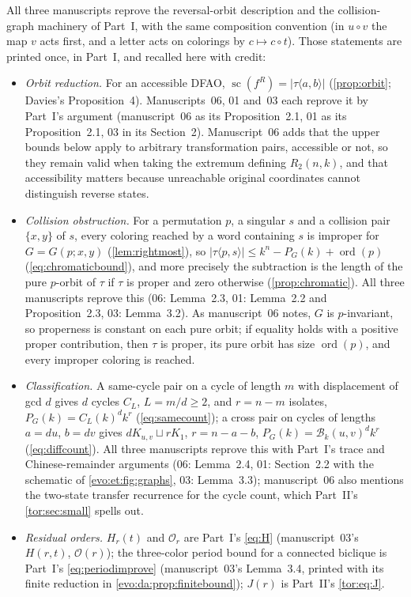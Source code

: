 \documentclass[11pt,a4paper]{article}
\numberwithin{equation}{section}
\theoremstyle{definition}
\theoremstyle{remark}
\newcommand{\ord}{\operatorname{ord}}
\newcommand{\statecomplex}{\operatorname{sc}}
\newcommand{\Bip}{\mathcal B}
\begin{document}
All three manuscripts reprove the reversal-orbit description and the
collision-graph machinery of Part~I, with the same composition convention
(in $u\circ v$ the map $v$ acts first, and a letter acts on colorings by
$c\mapsto c\circ t$). Those statements are printed once, in Part~I, and
recalled here with credit:
\begin{itemize}
\item \emph{Orbit reduction.} For an accessible DFAO,
 $\statecomplex(f^R)=|\tau\langle a,b\rangle|$ (\cref{prop:orbit};
 Davies's Proposition~4). Manuscripts~06, 01 and~03 each reprove it by
 Part~I's argument (manuscript~06 as its Proposition~2.1, 01 as its
 Proposition~2.1, 03 in its Section~2). Manuscript~06 adds that the upper
 bounds below apply to arbitrary transformation pairs, accessible or not, so
 they remain valid when taking the extremum defining $R_2(n,k)$, and that
 accessibility matters because unreachable original coordinates cannot
 distinguish reverse states.
\item \emph{Collision obstruction.} For a permutation $p$, a singular $s$ and
 a collision pair $\{x,y\}$ of $s$, every coloring reached by a word
 containing $s$ is improper for $G=G(p;x,y)$ (\cref{lem:rightmost}), so
 $|\tau\langle p,s\rangle|\le k^n-P_G(k)+\ord(p)$ (\eqref{eq:chromaticbound}),
 and more precisely the subtraction is the length of the pure $p$-orbit of
 $\tau$ if $\tau$ is proper and zero otherwise (\cref{prop:chromatic}). All
 three manuscripts reprove this (06: Lemma~2.3, 01: Lemma~2.2 and
 Proposition~2.3, 03: Lemma~3.2). As manuscript~06 notes, $G$ is
 $p$-invariant, so properness is constant on each pure orbit; if equality
 holds with a positive proper contribution, then $\tau$ is proper, its pure
 orbit has size $\ord(p)$, and every improper coloring is reached.
\item \emph{Classification.} A same-cycle pair on a cycle of length $m$ with
 displacement of gcd $d$ gives $d$ cycles $C_L$, $L=m/d\ge2$, and $r=n-m$
 isolates, $P_G(k)=C_L(k)^dk^r$ (\eqref{eq:samecount}); a cross pair on cycles
 of lengths $a=du$, $b=dv$ gives $dK_{u,v}\sqcup rK_1$, $r=n-a-b$,
 $P_G(k)=\Bip_k(u,v)^dk^r$ (\eqref{eq:diffcount}). All three manuscripts
 reprove this with Part~I's trace and Chinese-remainder arguments (06:
 Lemma~2.4, 01: Section~2.2 with the schematic of \cref{evo:et:fig:graphs},
 03: Lemma~3.3); manuscript~06 also mentions the two-state transfer recurrence
 for the cycle count, which Part~II's \cref{tor:sec:small} spells out.
\item \emph{Residual orders.} $H_r(t)$ and $\mathcal O_r$ are Part~I's
 \eqref{eq:H} (manuscript~03's $H(r,t)$, $\mathcal O(r)$); the three-color
 period bound for a connected biclique is Part~I's \eqref{eq:periodimprove}
 (manuscript~03's Lemma~3.4, printed with its finite reduction in
 \cref{evo:da:prop:finitebound}); $J(r)$ is Part~II's \eqref{tor:eq:J}.
\end{itemize}
\end{document}
